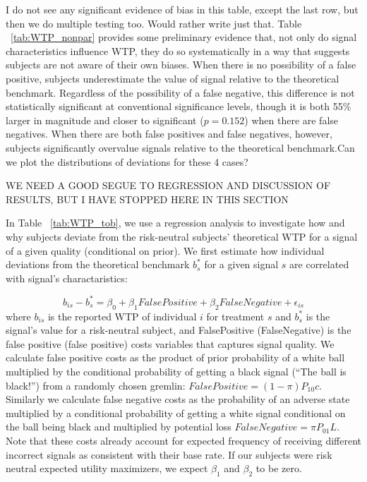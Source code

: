 \documentclass[12pt,a4paper]{article}
\newcommand{\aut}[1]{{\color{Red}#1}}
\newcommand{\pmt}[1]{{\color{Blue}#1}}
\begin{document}
\aut{I do not see any significant evidence of bias in this table, except the last row, but then we do multiple testing too. Would rather write just that.} Table ~\ref{tab:WTP_nonpar} provides some preliminary evidence that, not only do signal characteristics influence WTP, they do so systematically in a way that suggests subjects are not aware of their own biases.  When there is no possibility of a false positive, subjects underestimate the value of signal relative to the theoretical benchmark.  Regardless of the possibility of a false negative, this difference is not statistically significant at conventional significance levels, though it is both 55\% larger in magnitude and closer to significant ($p=0.152$) when there are false negatives.  When there are both false positives and false negatives, however, subjects significantly overvalue signals relative to the theoretical benchmark.\pmt{Can we plot the distributions of deviations for these 4 cases?}

\pmt{WE NEED A GOOD SEGUE TO REGRESSION AND DISCUSSION OF RESULTS, BUT I HAVE STOPPED HERE IN THIS SECTION}





In Table ~\ref{tab:WTP_tob}, we use a regression analysis to investigate how and why subjects deviate from the risk-neutral subjects’ theoretical WTP for a signal of a given quality (conditional on prior). We first estimate how individual deviations from the theoretical benchmark $b^*_s$ for a given signal $s$ are correlated with signal's charactaristics:

\[b_{is} - b^*_s = \beta_0 + \beta_1 FalsePositive + \beta_2 FalseNegative + \epsilon_{is}\]
where $b_{is}$ is the reported WTP of individual $i$ for treatment $s$ and $b^*_s$ is the signal's value for a risk-neutral subject, and FalsePositive (FalseNegative) is the false positive (false positive) costs variables that captures signal quality. We calculate false positive costs as the product of prior probability of a white ball multiplied by the conditional probability of getting a black signal (“The ball is black!”) from a randomly chosen gremlin: $FalsePositive=(1-\pi) P_{10}c$. Similarly we calculate false negative costs as the probability of an adverse state multiplied by a conditional probability of getting a white signal conditional on the ball being black and multiplied by potential loss $FalseNegative=\pi P_{01}L$. Note that these costs already account for expected frequency of receiving different incorrect signals as consistent with their base rate. If our subjects were risk neutral expected utility maximizers, we expect $\beta_1$ and $\beta_2$ to be zero.
\end{document}
